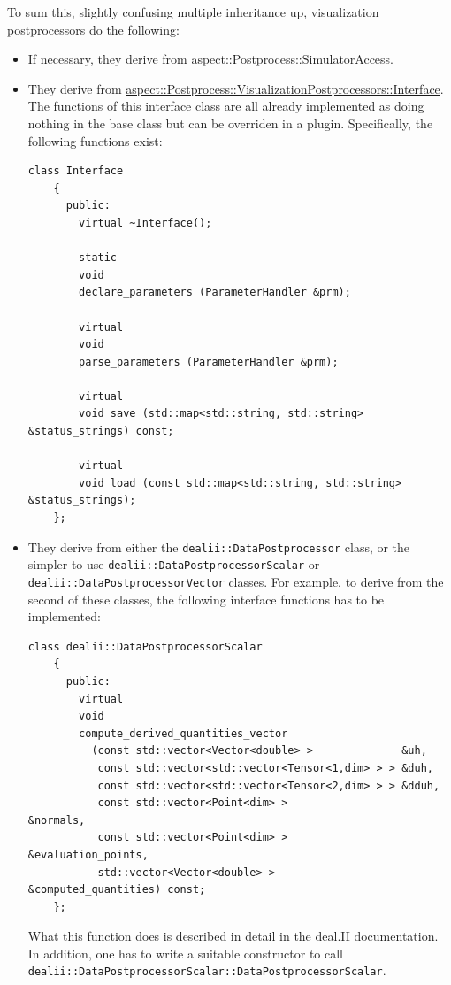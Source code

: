 \documentclass{article}
\begin{document}
To sum this, slightly confusing multiple inheritance up, visualization
postprocessors do the following:
\begin{itemize}
\item If necessary, they derive from
  \href{doc/doxygen/classaspect_1_1Postprocess_1_1SimulatorAccess.html}{aspect::Postprocess::SimulatorAccess}.
\item They derive from
  \href{doc/doxygen/classaspect_1_1Postprocess_1_1VisualizationPostprocessors_1_1Interface.html}{aspect::Postprocess::VisualizationPostprocessors::Interface}. The
  functions of this interface class are all already implemented as doing
  nothing in the base class but can be overriden in a plugin. Specifically,
  the following functions exist:
  \begin{lstlisting}[frame=single]
    class Interface
    {
      public:
        virtual ~Interface();

        static
        void
        declare_parameters (ParameterHandler &prm);

        virtual
        void
        parse_parameters (ParameterHandler &prm);

        virtual
        void save (std::map<std::string, std::string> &status_strings) const;

        virtual
        void load (const std::map<std::string, std::string> &status_strings);
    };
  \end{lstlisting}

\item They derive from either the \texttt{dealii::DataPostprocessor} class,
  or the simpler to use \texttt{dealii::DataPostprocessorScalar}
  or \texttt{dealii::DataPostprocessorVector} classes. For example, to derive
  from the second of these classes, the following interface functions has to be
  implemented:
  \begin{lstlisting}[frame=single]
    class dealii::DataPostprocessorScalar
    {
      public:
        virtual
        void
        compute_derived_quantities_vector
          (const std::vector<Vector<double> >              &uh,
           const std::vector<std::vector<Tensor<1,dim> > > &duh,
           const std::vector<std::vector<Tensor<2,dim> > > &dduh,
           const std::vector<Point<dim> >                  &normals,
           const std::vector<Point<dim> >                  &evaluation_points,
           std::vector<Vector<double> >                    &computed_quantities) const;
    };
  \end{lstlisting}
  What this function does is described in detail in the deal.II
  documentation. In addition, one has to write a suitable constructor to call
  \texttt{dealii::DataPostprocessorScalar::DataPostprocessorScalar}.
\end{itemize}
\end{document}
